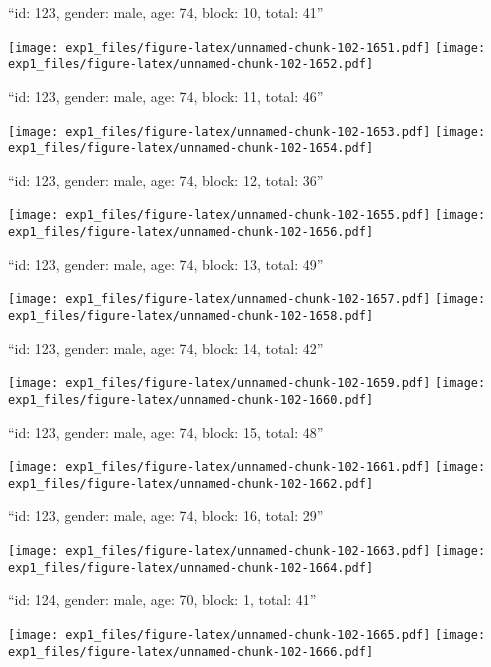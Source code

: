 \documentclass[11pt,,]{article}
\begin{document}
\newpage
[1] 

``id: 123, gender: male, age: 74, block: 10, total: 41''

\texttt{[image: exp1\_files/figure-latex/unnamed-chunk-102-1651.pdf]}
\texttt{[image: exp1\_files/figure-latex/unnamed-chunk-102-1652.pdf]}

\newpage
[1] 

``id: 123, gender: male, age: 74, block: 11, total: 46''

\texttt{[image: exp1\_files/figure-latex/unnamed-chunk-102-1653.pdf]}
\texttt{[image: exp1\_files/figure-latex/unnamed-chunk-102-1654.pdf]}

\newpage
[1] 

``id: 123, gender: male, age: 74, block: 12, total: 36''

\texttt{[image: exp1\_files/figure-latex/unnamed-chunk-102-1655.pdf]}
\texttt{[image: exp1\_files/figure-latex/unnamed-chunk-102-1656.pdf]}

\newpage
[1] 

``id: 123, gender: male, age: 74, block: 13, total: 49''

\texttt{[image: exp1\_files/figure-latex/unnamed-chunk-102-1657.pdf]}
\texttt{[image: exp1\_files/figure-latex/unnamed-chunk-102-1658.pdf]}

\newpage
[1] 

``id: 123, gender: male, age: 74, block: 14, total: 42''

\texttt{[image: exp1\_files/figure-latex/unnamed-chunk-102-1659.pdf]}
\texttt{[image: exp1\_files/figure-latex/unnamed-chunk-102-1660.pdf]}

\newpage
[1] 

``id: 123, gender: male, age: 74, block: 15, total: 48''

\texttt{[image: exp1\_files/figure-latex/unnamed-chunk-102-1661.pdf]}
\texttt{[image: exp1\_files/figure-latex/unnamed-chunk-102-1662.pdf]}

\newpage
[1] 

``id: 123, gender: male, age: 74, block: 16, total: 29''

\texttt{[image: exp1\_files/figure-latex/unnamed-chunk-102-1663.pdf]}
\texttt{[image: exp1\_files/figure-latex/unnamed-chunk-102-1664.pdf]}

\newpage
[1] 

``id: 124, gender: male, age: 70, block: 1, total: 41''

\texttt{[image: exp1\_files/figure-latex/unnamed-chunk-102-1665.pdf]}
\texttt{[image: exp1\_files/figure-latex/unnamed-chunk-102-1666.pdf]}
\end{document}
